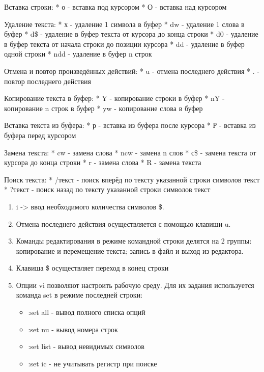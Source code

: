 \documentclass[
  12pt,
  a4paper,
]{scrreprt}
\providecommand{\tightlist}{%
  \setlength{\itemsep}{0pt}\setlength{\parskip}{0pt}}
\begin{document}
Вставка строки: * о - вставка под курсором * О - вставка над курсором

Удаление текста: * х - удаление 1 символа в буфер * dw - удаление 1
слова в буфер * d\$ - удаление в буфер текста от курсора до конца строки
* d0 - удаление в буфер текста от начала строки до позиции курсора * dd
- удаление в буфер одной строки * ndd - удаление в буфер n строк

Отмена и повтор произведённых действий: * u - отмена последнего действия
* . - повтор последнего действия

Копирование текста в буфер: * Y - копирование строки в буфер * nY -
копирование n строк в буфер * yw - копирование слова в буфер

Вставка текста из буфера: * р - вставка из буфера после курсора * Р -
вставка из буфера перед курсором

Замена текста: * cw - замена слова * ncw - замена n слов * с\$ - замена
текста от курсора до конца строки * r - замена слова * R - замена текста

Поиск текста: * /текст - поиск вперёд по тексту указанной строки
символов текст * ?текст - поиск назад по тексту указанной строки
символов текст

\begin{enumerate}
\def\labelenumi{\arabic{enumi}.}
\setcounter{enumi}{6}
\item
  i -\textgreater{} ввод необходимого количества символов \$.
\item
  Отмена последнего действия осуществляется с помощью клавиши u.
\item
  Команды редактирования в режиме командной строки делятся на 2 группы:
  копирование и перемещение текста; запись в файл и выход из редактора.
\item
  Клавиша \$ осуществляет переход в конец строки
\item
  Опции vi позволяют настроить рабочую среду. Для их задания
  используется команда set в режиме последней строки:

  \begin{itemize}
  \tightlist
  \item
    :set all - вывод полного списка опций
  \item
    :set nu - вывод номера строк
  \item
    :set list - вывод невидимых символов
  \item
    :set ic - не учитывать регистр при поиске
  \end{itemize}
\end{enumerate}
\end{document}

